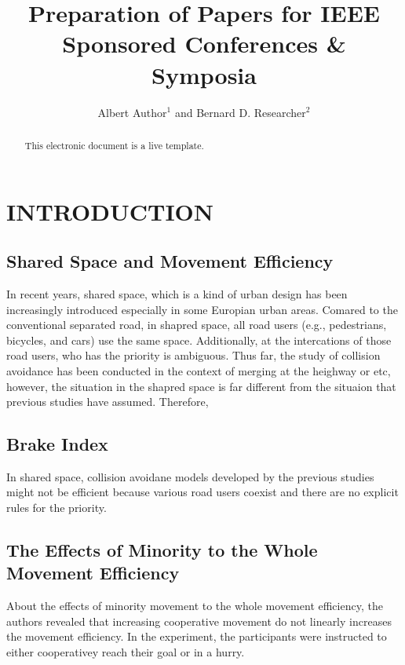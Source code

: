 \documentclass[letterpaper, 10 pt, conference]{ieeeconf}  %
\title{\LARGE \bf
Preparation of Papers for IEEE Sponsored Conferences \& Symposia
}
\author{Albert Author$^{1}$ and Bernard D. Researcher$^{2}$}
\begin{document}
\maketitle
\thispagestyle{empty}
\pagestyle{empty}


\begin{abstract}
This electronic document is a live template. 
\end{abstract}

\section{INTRODUCTION}
\subsection{Shared Space and Movement Efficiency}
In recent years, shared space, which is a kind of urban design has been increasingly introduced especially in some Europian urban areas. Comared to the conventional separated road, in shapred space, all road users (e.g., pedestrians, bicycles, and cars) use the same space. Additionally, at the intercations of those road users, who has the priority is ambiguous. Thus far, the study of collision avoidance has been conducted in the context of merging at the heighway or etc, however, the situation in the shapred space is far different from the situaion that previous studies have assumed. Therefore,  

\subsection{Brake Index}
In shared space, collision avoidane models developed by the previous studies might not be efficient because various road users coexist and there are no explicit rules for the priority.

\subsection{The Effects of Minority to the Whole Movement Efficiency}
About the effects of minority movement to the whole movement efficiency, the authors revealed that increasing cooperative movement do not linearly increases the movement efficiency. In the experiment, the participants were instructed to either cooperativey reach their goal or in a hurry.
\end{document}
